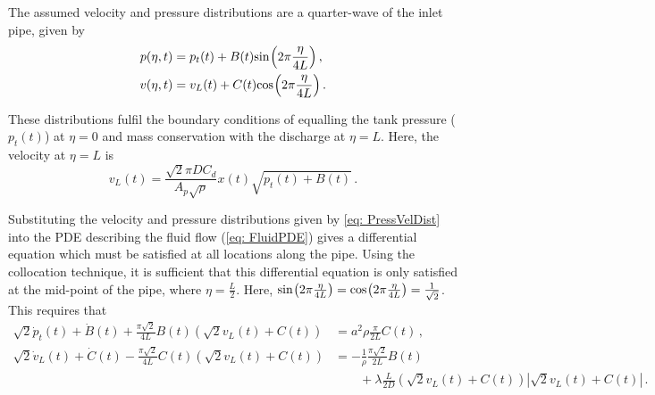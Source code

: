 



The assumed velocity and pressure distributions are a quarter-wave of the inlet pipe, given by
~
\begin{equation} %
\begin{split}
    p(\eta,t) &= p_t(t) + B(t) \fun{sin}{2\pi \frac{\eta}{4L}} \, ,\\
    v(\eta,t) &= v_L(t) + C(t) \fun{cos}{2\pi \frac{\eta}{4L}} \, .
\end{split}
\end{equation}

These distributions fulfil the boundary conditions of equalling the tank pressure ($p_t(t)$) at $\eta = 0$ and mass conservation with the discharge at $\eta = L$. Here, the velocity at $\eta = L$ is
~
\begin{equation*}
    v_L(t) = \frac{\sqrt{2} \pi D C_d}{A_p \sqrt{\rho}} x(t) \sqrt{p_t(t)+B(t)} \, .
\end{equation*}

Substituting the velocity and pressure distributions given by \cref{eq: PressVelDist} into the PDE describing the fluid flow (\cref{eq: FluidPDE}) gives a differential equation which must be satisfied at all locations along the pipe. Using the collocation technique, it is sufficient that this differential equation is only satisfied at the mid-point of the pipe, where $\eta = \frac{L}{2}$. Here, $\fun{sin}{2 \pi \frac{\eta}{4L}} = \fun{cos}{2 \pi \frac{\eta}{4L}} = \frac{1}{\sqrt{2}}$. This requires that
~
\begin{equation*}
\begin{split}
    \sqrt{2} \dot{p}_t(t) + \dot{B}(t) + \frac{\pi \sqrt{2}}{4 L} B(t) \left( \sqrt{2} v_L(t) + C(t) \right) &= a^2 \rho \frac{\pi}{2L} C(t) \, , \\
    \sqrt{2} \dot{v}_L(t) + \dot{C}(t) - \frac{\pi \sqrt{2}}{4 L} C(t) \left( \sqrt{2} v_L(t) + C(t) \right) &= - \frac{1}{\rho} \frac{\pi \sqrt{2}}{2 L} B(t) \\
    &\qquad + \lambda \frac{L}{2D} \left( \sqrt{2} v_L(t) + C(t) \right) \left| \sqrt{2} v_L(t) + C(t) \right| \, .
\end{split}
\end{equation*}

